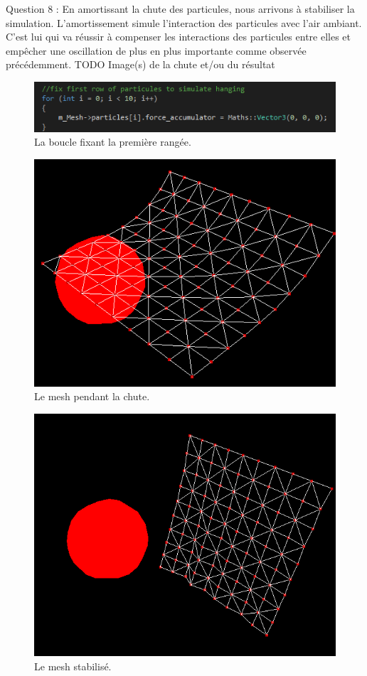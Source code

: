 \documentclass[a4paper,12pt]{article}
\begin{document}
Question 8 : En amortissant la chute des particules, nous arrivons à stabiliser la simulation. L'amortissement simule l'interaction des particules avec l'air ambiant. C'est lui qui va réussir à compenser les interactions des particules entre elles et empêcher une oscillation de plus en plus importante comme observée précédemment. 
TODO Image(s) de la chute et/ou du résultat
\begin{figure}
  \centering
  \includegraphics{images/rideau_code.png}
  \caption{La boucle fixant la première rangée.}
  \label{fig:rideauCode}
\end{figure}
\begin{figure}
  \centering
  \includegraphics{images/rideau_chute.png}
  \caption{Le mesh pendant la chute.}
  \label{fig:rideauCode}
\end{figure}
\begin{figure}
  \centering
  \includegraphics{images/rideau_fin.png}
  \caption{Le mesh stabilisé.}
  \label{fig:rideauCode}
\end{figure}
\end{document}
